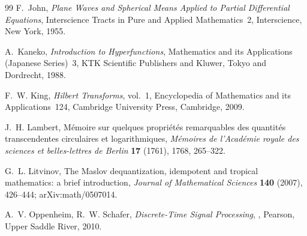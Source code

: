 \begin{thebibliography}{99}
F.~John, \emph{Plane Waves and Spherical Means Applied to Partial
Differential Equations}, Interscience Tracts in Pure and Applied
Mathematics~2, Interscience, New York, 1955.

A.~Kaneko, \emph{Introduction to Hyperfunctions}, Mathematics and its
Applications (Japanese Series)~3, KTK Scientific Publishers and Kluwer,
Tokyo and Dordrecht, 1988.

F.~W. King, \emph{Hilbert Transforms}, vol.~1, Encyclopedia of Mathematics
and its Applications~124, Cambridge University Press, Cambridge, 2009.

J.~H. Lambert, M\'emoire sur quelques propri\'et\'es remarquables des
quantit\'es transcendentes circulaires et logarithmiques,
\emph{M\'emoires de l'Acad\'emie royale des sciences et belles-lettres de
Berlin} \textbf{17} (1761), 1768, 265--322.

G.~L. Litvinov, The Maslov dequantization, idempotent and tropical
mathematics: a brief introduction, \emph{Journal of Mathematical Sciences}
\textbf{140} (2007), 426--444; arXiv:math/0507014.

A.~V. Oppenheim, R.~W. Schafer, \emph{Discrete-Time Signal Processing},
, Pearson, Upper Saddle River, 2010.

\end{thebibliography}
